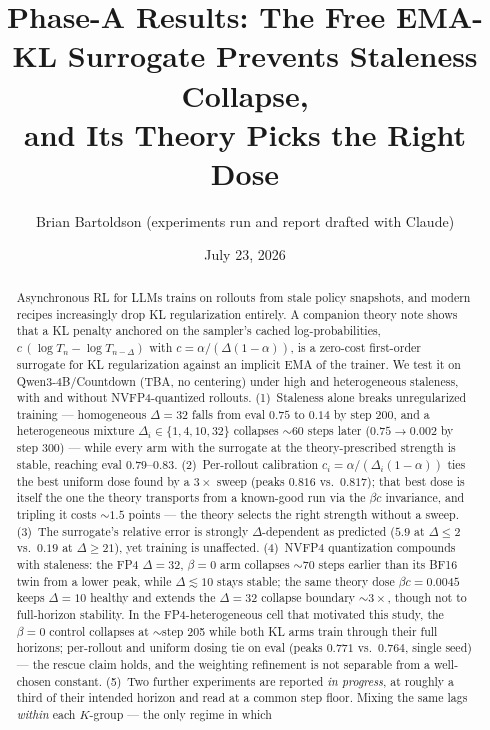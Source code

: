 \documentclass[11pt]{amsart}
\title[The Free EMA-KL Surrogate Prevents Staleness Collapse]{Phase-A Results: The Free EMA-KL Surrogate Prevents Staleness Collapse,\\
and Its Theory Picks the Right Dose}
\author{Brian Bartoldson (experiments run and report drafted with Claude)}
\date{July 23, 2026}
\begin{document}
\maketitle

\begin{abstract}
Asynchronous RL for LLMs trains on rollouts from stale policy snapshots, and
modern recipes increasingly drop KL regularization entirely. A companion
theory note shows that a KL penalty anchored on the sampler's cached
log-probabilities, $c\,(\log T_n - \log T_{n-\Delta})$ with
$c = \alpha/(\Delta(1-\alpha))$, is a zero-cost first-order surrogate for KL
regularization against an implicit EMA of the trainer. We test it on
Qwen3-4B/Countdown (TBA, no centering) under high and heterogeneous
staleness, with and without NVFP4-quantized rollouts. (1)~Staleness alone
breaks unregularized training --- homogeneous $\Delta{=}32$ falls from eval
$0.75$ to $0.14$ by step 200, and a heterogeneous mixture
$\Delta_i \in \{1,4,10,32\}$ collapses ${\sim}60$ steps later ($0.75 \to
0.002$ by step 300) --- while every arm with the surrogate at the
theory-prescribed strength is stable, reaching eval $0.79$--$0.83$.
(2)~Per-rollout calibration $c_i = \alpha/(\Delta_i(1-\alpha))$ ties the
best uniform dose found by a $3\times$ sweep (peaks $0.816$ vs.\ $0.817$);
that best dose is itself the one the theory transports from a known-good run
via the $\beta c$ invariance, and tripling it costs ${\sim}1.5$ points ---
the theory selects the right strength without a sweep. (3)~The surrogate's
relative error is strongly $\Delta$-dependent as predicted ($5.9$ at
$\Delta\le2$ vs.\ $0.19$ at $\Delta\ge21$), yet training is unaffected.
(4)~NVFP4 quantization compounds with staleness: the FP4 $\Delta{=}32$,
$\beta{=}0$ arm collapses ${\sim}70$ steps earlier than its BF16 twin from a
lower peak, while $\Delta{\lesssim}10$ stays stable; the same theory dose
$\beta c = 0.0045$ keeps $\Delta{=}10$ healthy and extends the $\Delta{=}32$
collapse boundary ${\sim}3\times$, though not to full-horizon stability. In
the FP4-heterogeneous cell that motivated this study, the $\beta{=}0$
control collapses at ${\sim}$step 205 while both KL arms train through their
full horizons; per-rollout and uniform dosing tie on eval (peaks $0.771$
vs.\ $0.764$, single seed) --- the rescue claim holds, and the weighting
refinement is not separable from a well-chosen constant.
(5)~Two further experiments are reported \emph{in progress}, at roughly a
third of their intended horizon and read at a common step floor. Mixing the
same lags \emph{within} each $K$-group --- the only regime in which

\end{abstract}
\end{document}
